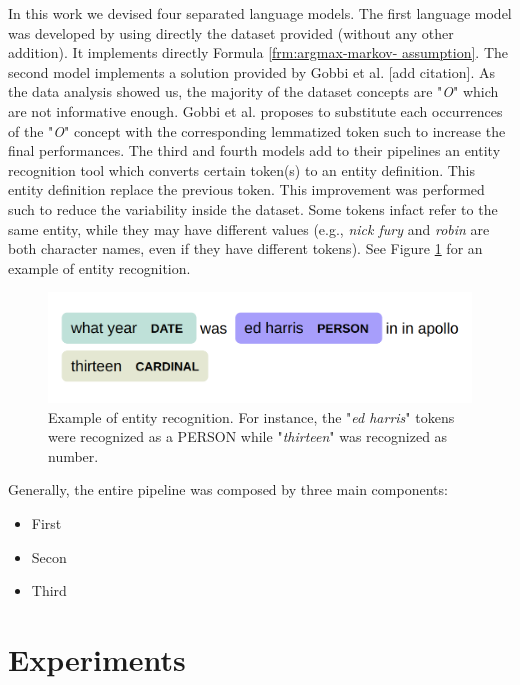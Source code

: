 \documentclass[11pt,a4paper]{article}
\begin{document}
In this work we devised four separated language models. 
The first language model was developed by using directly 
the dataset provided (without any other addition). It 
implements directly Formula \ref{frm:argmax-markov-
assumption}. The second model implements a solution 
provided by Gobbi et al. [add citation]. As the data 
analysis showed us, the majority of the dataset concepts 
are "\textit{O}" which are not informative enough. Gobbi 
et al. proposes to substitute each occurrences of the 
"\textit{O}" concept with the corresponding lemmatized 
token such to increase the final performances. 
The third and fourth models add to their pipelines an 
entity recognition tool which converts certain token(s) 
to an entity definition. This entity definition replace 
the previous token. This improvement was performed such to reduce the variability inside the dataset. Some tokens infact refer to the same entity, while they may have different values (e.g., \textit{nick fury} and \textit{robin} are both character names, even if they have different tokens). See Figure \ref{fig:entity-recognition} for an example of entity recognition.

\begin{figure}[h!]
\centering
	\includegraphics[width=1\linewidth]{img/entity}
	\caption{Example of entity recognition. For instance, the "\textit{ed harris}" tokens were recognized as a PERSON while "\textit{thirteen}" was recognized as number.}
	\label{fig:entity-recognition}
\end{figure}

Generally, the entire pipeline was composed by three main components:
\begin{itemize}
\item First
\item Secon
\item Third
\end{itemize}

\section{Experiments}
\end{document}
